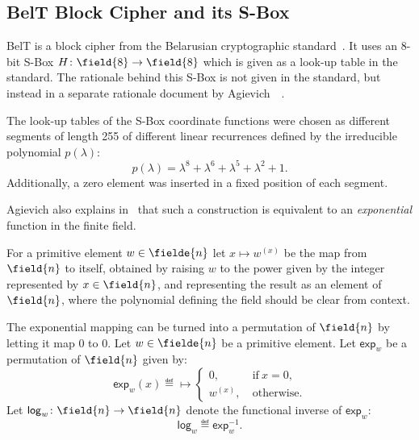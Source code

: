 
\subsection{BelT Block Cipher and its S-Box}

BelT is a block cipher from the Belarusian cryptographic standard~\cite{BELT}. It uses an 8-bit S-Box $H\colon \field{8} \to \field{8}$ which is given as a look-up table in the standard. The rationale behind this S-Box is not given in the standard, but instead in a separate rationale document by Agievich~\etal{}~\cite{BELTratio}.

\begin{proposition}
The look-up tables of the S-Box coordinate functions were chosen as different segments of length 255 of different linear recurrences defined by the irreducible polynomial $p(\lambda)$:
$$
p(\lambda) = \lambda^8 + \lambda^6 + \lambda^5 + \lambda^2 + 1.
$$
Additionally, a zero element was inserted in a fixed position of each segment.
\end{proposition}

Agievich also explains in~\cite{AA2004,AA2004rus} that such a construction is equivalent to an \emph{exponential} function in the finite field. 

\newcommand\fexp[2]{#1^{(#2)}}
\newcommand\pexp[1]{\mathsf{exp}_{#1}}
\newcommand\plog[1]{\mathsf{log}_{#1}}

\begin{definition}
For a primitive element $w \in \fielde{n}$ let $x \mapsto \fexp{w}{x}$ be the map from $\field{n}$ to itself, obtained by raising $w$ to the power given by the integer represented by $x \in \field{n}$, and representing the result as an element of $\field{n}$, where the polynomial defining the field should be clear from context.

The exponential mapping can be turned into a permutation of $\field{n}$ by letting it map 0 to 0. Let $w \in \fielde{n}$ be a primitive element. Let $\pexp{w}$ be a permutation of $\field{n}$ given by:
$$
\pexp{w}(x) \eqdef \mapsto \begin{cases}
0, &~\text{if}~x = 0,\\
\fexp{w}{x}, &~\text{otherwise}.
\end{cases}
$$
Let $\plog{w}\colon \field{n} \to \field{n}$ denote the functional inverse of $\pexp{w}$:
$$
\plog{w} \eqdef \pexp{w}^{-1}.
$$
\end{definition}

